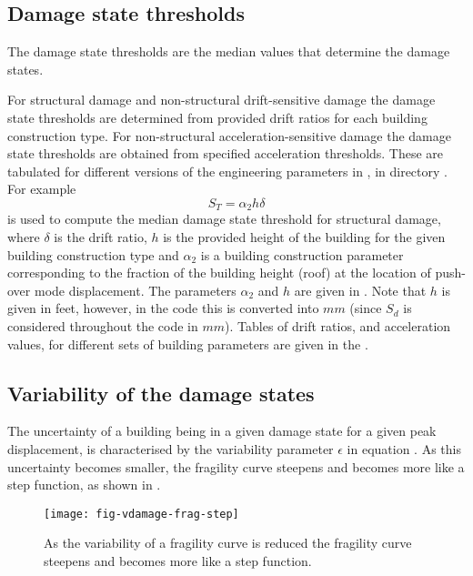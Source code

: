 \subsection{Damage state thresholds}

The damage state thresholds are the median values that determine the
damage states.

For structural damage and non-structural drift-sensitive damage
the damage state thresholds are determined from provided drift
ratios for each building construction type. For non-structural
acceleration-sensitive damage the damage state thresholds are
obtained from specified acceleration thresholds. These are
tabulated for different versions of the engineering parameters in
, in directory
. For example
\begin{equation}
\label{eq:damage-dstate}
 S_T = \alpha_2 h\delta
\end{equation}
is used to compute the median damage state threshold for
structural damage, where $\delta$ is the drift ratio, $h$ is the
provided height of the building for the given building
construction type and $\alpha_2$ is a building construction
parameter corresponding to the fraction of the building height
(roof) at the location of push-over mode displacement. The
parameters $\alpha_2$ and $h$ are given in
. Note that $h$ is given in
feet, however, in the code this is converted into $mm$ (since
$S_d$ is considered throughout the code in $mm$). Tables of drift
ratios, and acceleration values, for different sets of building
parameters are given in the .


\subsection{Variability of the damage states}

The uncertainty of a building being in a given damage state for a
given peak displacement, is characterised
by the variability parameter $\epsilon$ in equation
. As this uncertainty becomes smaller, the
fragility curve steepens and becomes more
like a step function, as shown in .

\begin{figure}[htp]
\centering {}
\texttt{[image: fig-vdamage-frag-step]}
\caption{As the variability of a fragility curve is reduced the
  fragility curve steepens and becomes more like a step function.}
\label{fig:vdamage-frag-var}
\end{figure}


